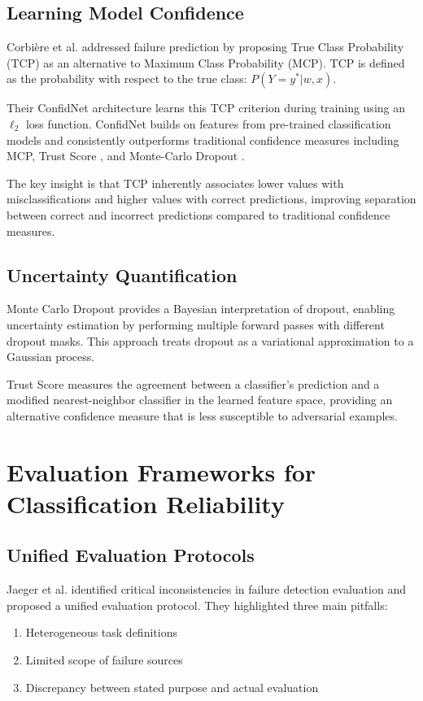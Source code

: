 \subsection{Learning Model Confidence}

Corbière et al. \cite{Corbiere2019} addressed failure prediction by proposing True Class Probability (TCP) as an alternative to Maximum Class Probability (MCP). TCP is defined as the probability with respect to the true class: $P(Y = y^*|w,x)$. 

Their ConfidNet architecture learns this TCP criterion during training using an $\ell_2$ loss function. ConfidNet builds on features from pre-trained classification models and consistently outperforms traditional confidence measures including MCP, Trust Score \cite{Jiang2018}, and Monte-Carlo Dropout \cite{Gal2016}.

The key insight is that TCP inherently associates lower values with misclassifications and higher values with correct predictions, improving separation between correct and incorrect predictions compared to traditional confidence measures.

\subsection{Uncertainty Quantification}

Monte Carlo Dropout \cite{Gal2016} provides a Bayesian interpretation of dropout, enabling uncertainty estimation by performing multiple forward passes with different dropout masks. This approach treats dropout as a variational approximation to a Gaussian process.

Trust Score \cite{Jiang2018} measures the agreement between a classifier's prediction and a modified nearest-neighbor classifier in the learned feature space, providing an alternative confidence measure that is less susceptible to adversarial examples.

\section{Evaluation Frameworks for Classification Reliability}

\subsection{Unified Evaluation Protocols}

Jaeger et al. \cite{Jaeger2022} identified critical inconsistencies in failure detection evaluation and proposed a unified evaluation protocol. They highlighted three main pitfalls:
\begin{enumerate}
    \item Heterogeneous task definitions
    \item Limited scope of failure sources
    \item Discrepancy between stated purpose and actual evaluation
\end{enumerate}

